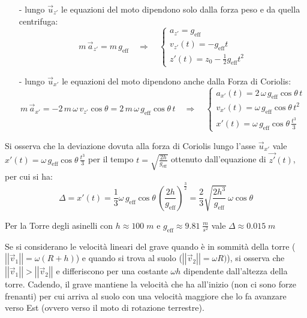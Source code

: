 \documentclass[a4paper]{article}
\newcommand\uxp{\vec{u}_{x'}}
\newcommand\uzp{\vec{u}_{z'}}
\newcommand\vmod[1]{\left|\left|{#1}\right|\right|}
\begin{document}
\begin{itemize}[topsep=3pt, itemsep=0pt]
	\item[-] lungo \(\uzp\) le equazioni del moto dipendono solo dalla forza peso e da quella centrifuga:
	\[m \, \vec{a}_{z'} = m \, g_\text{eff} \quad \Rightarrow \quad \begin{cases}
		a_{z'} = g_\text{eff} \\
		v_{z'}(t) = -g_\text{eff} t \\
		z'(t) = z_0 - \frac{1}{2} g_\text{eff} t^2
	\end{cases}\]
	\item[-] lungo \(\uxp\) le equazioni del moto dipendono anche dalla Forza di Coriolis:
	\[m \, \vec{a}_{x'} = - 2 \, m \, \omega \, v_{z'} \cos \theta = 2 \, m \, \omega \, g_\text{eff} \cos \theta \, t \quad \Rightarrow \quad \begin{cases}
		a_{x'}(t) = 2 \, \omega \, g_\text{eff} \cos \theta \, t \\
		v_{x'}(t) = \omega \, g_\text{eff} \cos \theta \, t^2 \\
		\displaystyle x'(t) = \omega \, g_\text{eff} \cos \theta \, \frac{t^3}{3}
	\end{cases}\]
\end{itemize}

Si osserva che la deviazione dovuta alla forza di Coriolis lungo l'asse \(\uxp\) vale \(x'(t) = \omega \, g_\text{eff} \cos \theta \, \frac{t^3}{3}\)
per il tempo \(t = \sqrt{\frac{2 h}{g_\text{eff}}}\) ottenuto dall'equazione di \(\vec{z'}(t)\), per cui si ha:
\[\Delta = x'(t) = \frac{1}{3} \omega \, g_\text{eff} \cos \theta \, \left( \frac{2h}{g_\text{eff}} \right)^\frac{3}{2} = \frac{2}{3} \sqrt{\frac{2h^3}{g_\text{eff}}} \, \omega \cos \theta\]

Per la Torre degli asinelli con \(h \approx 100 \; m\) e \(g_\text{eff} \approx 9.81 \; \frac{m}{s^2}\) vale \(\Delta \approx 0.015 \; m\)

Se si considerano le velocità lineari del grave quando è in sommità della torre (\(\vmod{\vec{v}_1} = \omega (R + h)\)) e quando si trova
al suolo (\(\vmod{\vec{v}_2} = \omega R)\)), si osserva che \(\vmod{\vec{v}_1} > \vmod{\vec{v}_2}\) e differiscono per una costante \(\omega h\) dipendente
dall'altezza della torre. Cadendo, il grave mantiene la velocità che ha all'inizio (non ci sono forze frenanti) per cui arriva al suolo con
una velocità maggiore che lo fa avanzare verso Est (ovvero verso il moto di rotazione terrestre).
\end{document}
